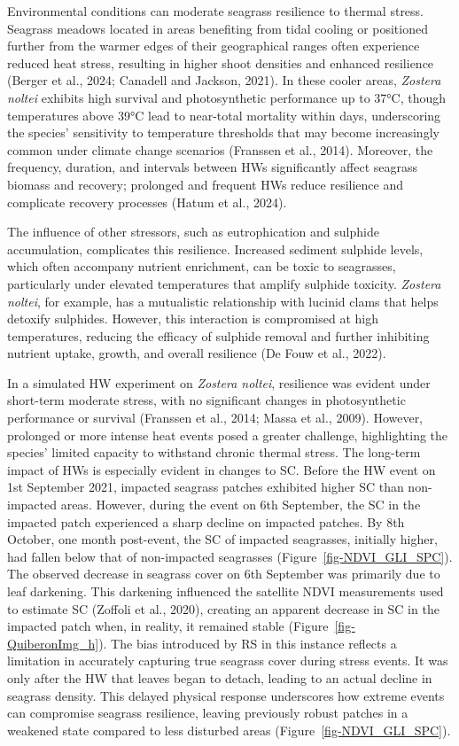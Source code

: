 \documentclass[
  letterpaper,
  11pt,
  english,
  singlespacing,
  headsepline]{MastersDoctoralThesis}
\begin{document}
\begin{spacing}{1.5}
Environmental conditions can moderate seagrass resilience to thermal
stress. Seagrass meadows located in areas benefiting from tidal cooling
or positioned further from the warmer edges of their geographical ranges
often experience reduced heat stress, resulting in higher shoot
densities and enhanced resilience (Berger et al., 2024; Canadell and
Jackson, 2021). In these cooler areas, \emph{Zostera noltei} exhibits
high survival and photosynthetic performance up to 37°C, though
temperatures above 39°C lead to near-total mortality within days,
underscoring the species' sensitivity to temperature thresholds that may
become increasingly common under climate change scenarios (Franssen et
al., 2014). Moreover, the frequency, duration, and intervals between HWs
significantly affect seagrass biomass and recovery; prolonged and
frequent HWs reduce resilience and complicate recovery processes (Hatum
et al., 2024).

The influence of other stressors, such as eutrophication and sulphide
accumulation, complicates this resilience. Increased sediment sulphide
levels, which often accompany nutrient enrichment, can be toxic to
seagrasses, particularly under elevated temperatures that amplify
sulphide toxicity. \emph{Zostera noltei}, for example, has a mutualistic
relationship with lucinid clams that helps detoxify sulphides. However,
this interaction is compromised at high temperatures, reducing the
efficacy of sulphide removal and further inhibiting nutrient uptake,
growth, and overall resilience (De Fouw et al., 2022).

In a simulated HW experiment on \emph{Zostera noltei}, resilience was
evident under short-term moderate stress, with no significant changes in
photosynthetic performance or survival (Franssen et al., 2014; Massa et
al., 2009). However, prolonged or more intense heat events posed a
greater challenge, highlighting the species' limited capacity to
withstand chronic thermal stress. The long-term impact of HWs is
especially evident in changes to SC. Before the HW event on 1st
September 2021, impacted seagrass patches exhibited higher SC than
non-impacted areas. However, during the event on 6th September, the SC
in the impacted patch experienced a sharp decline on impacted patches.
By 8th October, one month post-event, the SC of impacted seagrasses,
initially higher, had fallen below that of non-impacted seagrasses
(Figure~\ref{fig-NDVI_GLI_SPC}). The observed decrease in seagrass cover
on 6th September was primarily due to leaf darkening. This darkening
influenced the satellite NDVI measurements used to estimate SC (Zoffoli
et al., 2020), creating an apparent decrease in SC in the impacted patch
when, in reality, it remained stable (Figure~\ref{fig-QuiberonImg_h}).
The bias introduced by RS in this instance reflects a limitation in
accurately capturing true seagrass cover during stress events. It was
only after the HW that leaves began to detach, leading to an actual
decline in seagrass density. This delayed physical response underscores
how extreme events can compromise seagrass resilience, leaving
previously robust patches in a weakened state compared to less disturbed
areas (Figure~\ref{fig-NDVI_GLI_SPC}).


\end{spacing}
\end{document}
